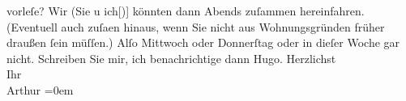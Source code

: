\begin{ledgroupsized}[t]{13cm}
{                  vorleſe}{}\label{K_L01188_1h}? Wir (Sie u ich{[}){]}{ }{\pb}könnten dann Abends zuſammen
               hereinfahren. (Eventuell auch zuſa{\geminationm}en hinaus, wenn Sie
               nicht aus Wohnungsgründen früher draußen ſein müſſen.)\pend
           \pstart
           Alſo Mittwoch oder Donnerſtag oder in dieſer Woche gar
               nicht.\pend
           \pstart
           {\pb}Schreiben Sie mir, ich benachrichtige dann Hugo.\pend
           \pstart
           Herzlichst{\\[\baselineskip]}Ihr{\\[\baselineskip]}\spacefill\mbox{Arthur}\pend
           \leftskip=0em{}
         
         \endnumbering{}\end{ledgroupsized}  \newcommand{\dateiname}{L01188}\newcommand{\titel}{Arthur Schnitzler an Richard Beer-Hofmann, 25. 11. 1901}\newcommand{\editorInnen}{Martin Anton Müller und Gerd-Hermann Susen}
      